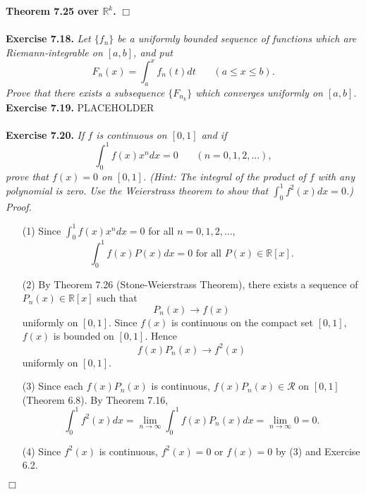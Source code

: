 \documentclass{article}
\begin{document}
\textbf{Theorem 7.25 over $\mathbb{R}^k$.}
$\Box$ \\\\






\textbf{Exercise 7.18.}
\emph{Let $\{f_n\}$ be a uniformly bounded sequence of functions which are
Riemann-integrable on $[a,b]$, and put
\[
  F_n(x) = \int_{a}^{x} f_n(t)dt
  \:\:\:\:\:\:\:\:
  (a \leq x \leq b).
\]
Prove that there exists a subsequence $\{F_{n_k}\}$ which
converges uniformly on $[a,b]$.} \\






\textbf{Exercise 7.19.}
PLACEHOLDER \\\\






\textbf{Exercise 7.20.}
\emph{If $f$ is continuous on $[0,1]$ and if
\[
  \int_{0}^{1} f(x) x^n dx = 0
  \:\:\:\:\:\:\:\:
  (n=0,1,2,\ldots),
\]
prove that $f(x) = 0$ on $[0,1]$.
(Hint: The integral of the product of $f$ with any polynomial is zero.
Use the Weierstrass theorem to show that
$\int_{0}^{1} f^2(x) dx = 0$.)} \\

\emph{Proof.}
\begin{enumerate}
\item[(1)]
Since $\int_{0}^{1} f(x) x^n dx = 0$ for all $n = 0,1,2,\ldots$,
\[
  \int_{0}^{1} f(x) P(x) dx = 0 \text{ for all } P(x) \in \mathbb{R}[x].
\]

\item[(2)]
By Theorem 7.26 (Stone-Weierstrass Theorem),
there exists a sequence of $P_n(x) \in \mathbb{R}[x]$ such that
\[
  P_n(x) \to f(x)
\]
uniformly on $[0,1]$.
Since $f(x)$ is continuous on the compact set $[0,1]$, $f(x)$ is bounded on $[0,1]$.
Hence
\[
  f(x) P_n(x) \to f^2(x)
\]
uniformly on $[0,1]$.

\item[(3)]
Since each $f(x) P_n(x)$ is continuous,
$f(x) P_n(x) \in \mathscr{R}$ on $[0,1]$ (Theorem 6.8).
By Theorem 7.16,
\[
  \int_{0}^{1} f^2(x) dx
  = \lim_{n \to \infty} \int_{0}^{1} f(x) P_n(x) dx
  = \lim_{n \to \infty} 0
  = 0.
\]

\item[(4)]
Since $f^2(x)$ is continuous,
$f^2(x) = 0$ or $f(x) = 0$ by (3) and Exercise 6.2.
\end{enumerate}
$\Box$ \\\\
\end{document}
